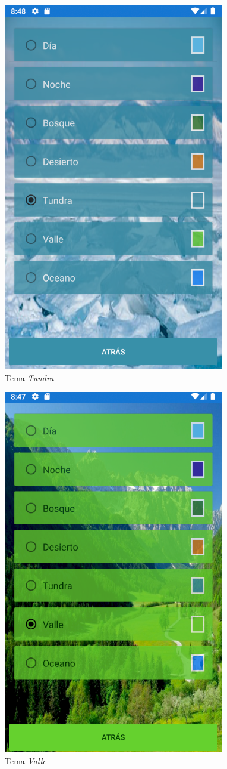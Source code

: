 \begin{figure}[H]
    \centering
    \includegraphics[scale=0.7]{Figures/Capturas/TemaTundra.png}
    \caption{Tema \textit{Tundra}}
    \label{Tundra}    
\end{figure}
\begin{figure}[H]
    \centering
    \includegraphics[scale=0.7]{Figures/Capturas/TemaValle.png}
    \caption{Tema \textit{Valle}}
    \label{Valle}    
\end{figure}
